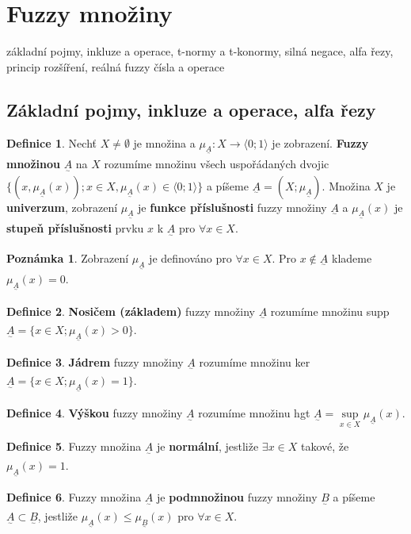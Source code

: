 \documentclass[a4]{report}
\newcommand{\fA}{\underset{^\sim}A}
\newcommand{\fB}{\underset{^\sim}B}
\newcommand{\muA}{\mu_{\fA}}
\newcommand{\muB}{\mu_{\fB}}
\theoremstyle{definition}
\newtheorem{definition}{Definice}[section]
\newtheorem{remark}{Poznámka}[section]
\begin{document}
{\section{ Fuzzy množiny}
základní pojmy, inkluze a operace, t-normy a t-konormy, silná negace, alfa řezy, princip rozšíření, reálná fuzzy čísla a operace

\subsection{Základní pojmy, inkluze a operace, alfa řezy}

\begin{definition}
Nechť $X \neq \emptyset$ je množina a $\muA: X \rightarrow \langle 0;1 \rangle$ je zobrazení. \textbf{Fuzzy množinou} $\fA$ na $X$ rozumíme množinu všech uspořádaných dvojic $\lbrace (x, \muA(x)); x \in X, \muA(x) \in \langle 0;1 \rangle \rbrace$ a píšeme $\fA = (X; \muA)$. Množina $X$ je \textbf{univerzum}, zobrazení $\muA$ je \textbf{funkce příslušnosti} fuzzy množiny $\fA$ a $\muA(x)$ je \textbf{stupeň příslušnosti} prvku $x$ k $\fA$ pro $\forall x \in X$.
\end{definition}

\begin{remark}
Zobrazení $\muA$ je definováno pro $\forall x \in X$. Pro $x \notin \fA$ klademe $\muA(x)=0$.
\end{remark}

\begin{definition}
\textbf{Nosičem (základem)} fuzzy množiny $\fA$ rozumíme množinu supp $\fA = \lbrace x \in X; \muA(x) > 0 \rbrace$.
\end{definition}

\begin{definition}
\textbf{Jádrem} fuzzy množiny $\fA$ rozumíme množinu ker $\fA = \lbrace x \in X; \muA(x) = 1 \rbrace$.
\end{definition}

\begin{definition}
\textbf{Výškou} fuzzy množiny $\fA$ rozumíme množinu hgt $\fA = \sup\limits_{x \in X} \muA(x)$.
\end{definition}

\begin{definition}
Fuzzy množina $\fA$ je \textbf{normální}, jestliže $\exists x \in X$ takové, že $\muA(x) = 1$.
\end{definition}

\begin{definition}
Fuzzy množina $\fA$ je \textbf{podmnožinou} fuzzy množiny $\fB$ a píšeme $\fA \subset \fB$, jestliže $\muA(x) \leq \muB(x)$ pro $\forall x \in X$.
\end{definition}

}
\end{document}
